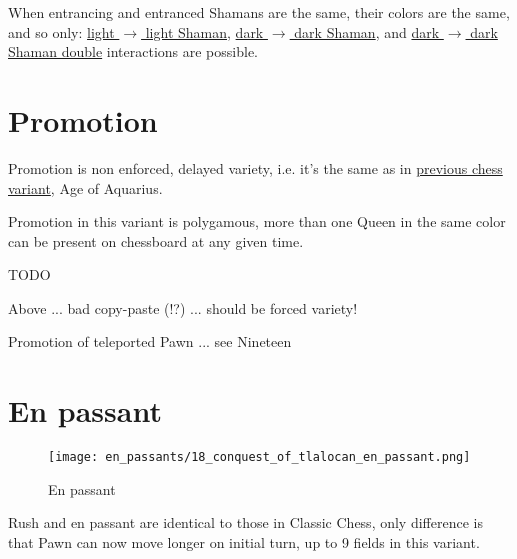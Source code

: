 When entrancing and entranced Shamans are the same, their colors are the same, and so only: \newline
\hyperref[fig:scn_cot_16_light_light_shaman_interaction_start]{light $\rightarrow$ light Shaman}, \newline
\hyperref[fig:scn_cot_20_dark_dark_shaman_interaction_start]{dark $\rightarrow$ dark Shaman}, and \newline
\hyperref[fig:scn_cot_22_dark_dark_shaman_double_interaction_start]{dark $\rightarrow$ dark Shaman double}
interactions are possible.

\clearpage %

\section*{Promotion}

Promotion is non enforced, delayed variety, i.e. it's the same as in
\hyperref[sec:Age of Aquarius/Promotion]{previous chess variant}, Age of Aquarius.

Promotion in this variant is polygamous, more than one Queen in the same color
can be present on chessboard at any given time.

\huge{TODO}
\normalsize{}

Above ... bad copy-paste (!?) ... should be forced variety!

Promotion of teleported Pawn ... see Nineteen

\clearpage %

\section*{En passant}

\noindent
\begin{wrapfigure}{l}{0.4\textwidth}
\centering
\texttt{[image: en\_passants/18\_conquest\_of\_tlalocan\_en\_passant.png]}
\caption{En passant}
\label{fig:18_conquest_of_tlalocan_en_passant}
\end{wrapfigure}
Rush and en passant are identical to those in Classic Chess, only difference
is that Pawn can now move longer on initial turn, up to 9 fields in this
variant.

